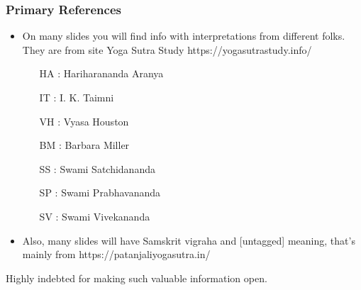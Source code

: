 \begin{frame}[fragile]\frametitle{Primary References}
	\begin{itemize}
	\item On many slides you will find info with interpretations from different folks. They are from  site Yoga Sutra Study https://yogasutrastudy.info/
		\begin{itemize}
		\item [HA]: Hariharananda Aranya
		\item [IT]: I. K. Taimni
		\item [VH]: Vyasa Houston
		\item [BM]: Barbara Miller
		\item [SS]: Swami Satchidananda
		\item [SP]: Swami Prabhavananda
		\item [SV]: Swami Vivekananda
		\end{itemize}	
	\item Also, many slides will have Samskrit vigraha and [untagged] meaning, that's mainly from https://patanjaliyogasutra.in/
	\end{itemize}

Highly indebted for making such valuable information open.

\end{frame}

